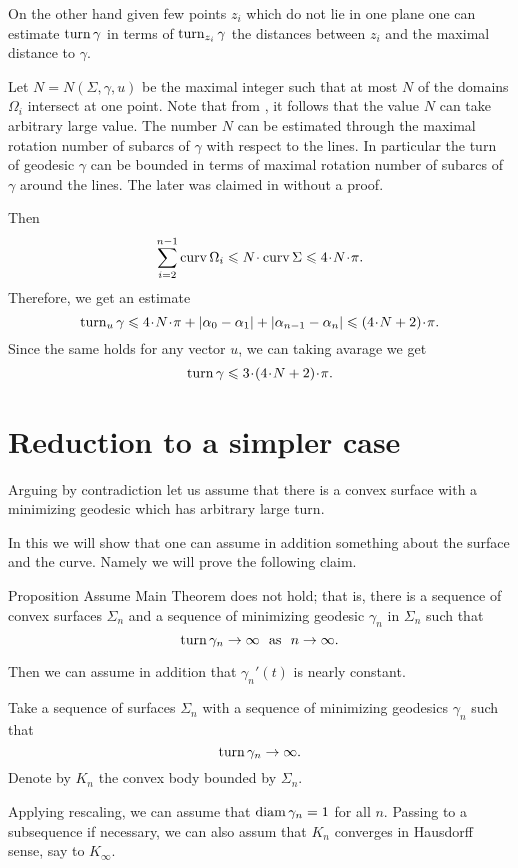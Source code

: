 \documentclass[a4paper,10pt]{amsart}
\begin{document}
On the other hand given few points $z_i$ which do not lie in one plane
one can estimate $\mathop{\rm turn}\nolimits\gamma$ 
in terms of $\mathop{\rm turn}\nolimits_{z_i}\gamma$ 
the distances between $z_i$ and the maximal distance to $\gamma$.

Let $N=N(\Sigma,\gamma, u)$ be the maximal integer such that at most $N$ of the domains $\Omega_i$ intersect at one point.
Note that from \cite{BKZ}, it follows that the value $N$ can take arbitrary large value.
The number $N$ can be estimated through the maximal rotation number of subarcs of $\gamma$ with respect to the lines.
In particular the turn of geodesic $\gamma$ can be bounded in terms of maximal rotation number of subarcs of $\gamma$ around the lines.
The later was claimed in \cite{BKZ} without a proof.

Then
\[\sum_{i=2}^{n-1}\curv\Omega_i
\le 
N\cdot\curv\Sigma
\le 
4\cdot N\cdot\pi.\]
Therefore, we get an estimate
\[\turn_u\gamma
\le 
4\cdot N\cdot\pi+|\alpha_0-\alpha_1|+|\alpha_{n-1}-\alpha_n|
\le
(4\cdot N+2)\cdot\pi.\]
Since the same holds for any vector $u$,
we can taking avarage we get
\[\turn\gamma\le 3\cdot(4\cdot N+2)\cdot\pi.\]

\section{Reduction to a simpler case}

Arguing by contradiction 
let us assume that 
there is a convex surface with a minimizing geodesic which has arbitrary large turn.

In this we will show that one can assume in addition something about the surface and the curve.
Namely we will prove the following claim.

\begin{thm}{Proposition}\label{prop:almost-const}
Assume Main Theorem does not hold;
that is, there is a sequence of convex surfaces $\Sigma_n$
and a sequence of minimizing geodesic $\gamma_n$ in $\Sigma_n$ such that 
\[\turn \gamma_n\to\infty\ \ \text{as}\ \ n\to\infty.\]

Then we can assume in addition that $\gamma_n'(t)$ is nearly constant.
\end{thm}

Take a sequence of surfaces $\Sigma_n$ with a sequence of minimizing geodesics $\gamma_n$ such that 
\[\mathop{\rm turn}\nolimits\gamma_n\to \infty.\]
Denote by $K_n$ the convex body bounded by $\Sigma_n$.

Applying rescaling, we can assume that $\operatorname{diam}\gamma_n=1$ for all $n$.
Passing to a subsequence if necessary, we can also assum that $K_n$ converges in Hausdorff sense, say to $K_\infty$.
\end{document}
